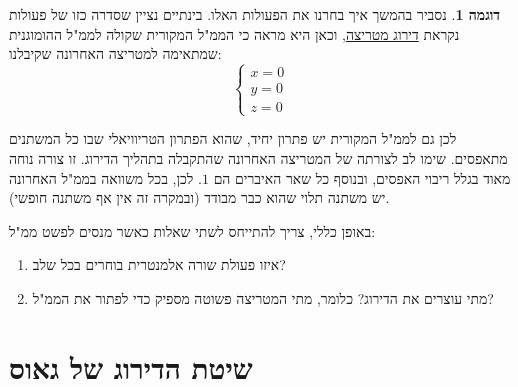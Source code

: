 \documentclass[12pt]{report}
\theoremstyle{plain}
\theoremstyle{definition}
\newtheorem{example}{דוגמה}[chapter]
\newcommand{\0}{\mathbf{0}}
\begin{document}
\begin{example}
נסביר בהמשך איך בחרנו את הפעולות האלו. בינתיים נציין שסדרה כזו של
פעולות נקראת
\underline{דירוג מטריצה},
וכאן היא מראה כי הממ"ל
המקורית שקולה לממ"ל ההומוגנית שמתאימה למטריצה האחרונה שקיבלנו:
$$
\begin{cases}
x=0\\
y=0\\
z=0
\end{cases}
$$

לכן גם לממ"ל המקורית יש פתרון יחיד, שהוא הפתרון הטריוויאלי שבו כל המשתנים מתאפסים.
שימו לב לצורתה של המטריצה האחרונה שהתקבלה בתהליך הדירוג. זו צורה נוחה
מאוד בגלל ריבוי האפסים, ובנוסף כל שאר האיברים הם $1$. לכן, בכל
משוואה בממ"ל האחרונה יש משתנה תלוי שהוא כבר מבודד (ובמקרה
זה אין אף משתנה חופשי).
\end{example}

באופן כללי, צריך להתייחס לשתי שאלות כאשר מנסים לפשט ממ"ל:

\begin{enumerate}
\item איזו פעולת שורה אלמנטרית בוחרים בכל שלב?

\item מתי עוצרים את הדירוג? כלומר, מתי המטריצה פשוטה מספיק
כדי לפתור את הממ"ל?
\end{enumerate}

\section{שיטת הדירוג של גאוס}
\end{document}
